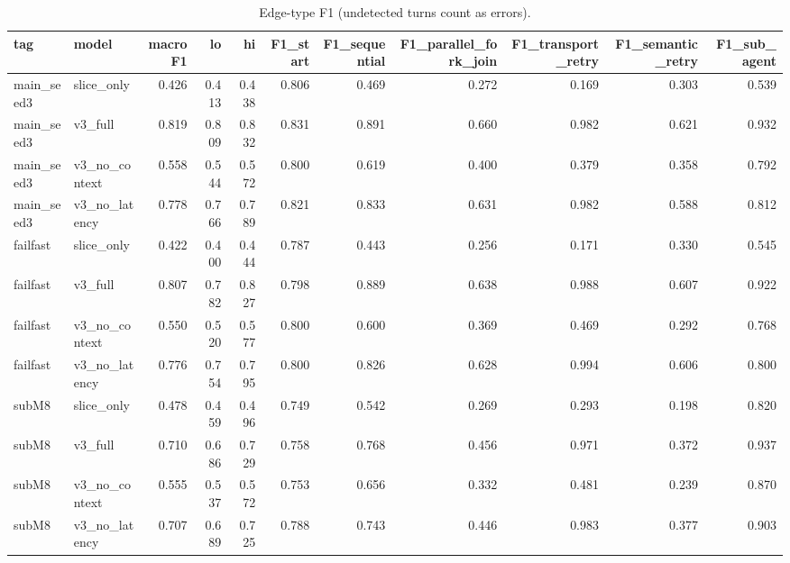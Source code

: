 \begin{table}
\caption{Edge-type F1 (undetected turns count as errors).}
\label{tab:edges}
\begin{tabular}{llrrrrrrrrr}
\toprule
tag & model & macroF1 & lo & hi & F1\_start & F1\_sequential & F1\_parallel\_fork\_join & F1\_transport\_retry & F1\_semantic\_retry & F1\_sub\_agent \\
\midrule
main\_seed3 & slice\_only & 0.426 & 0.413 & 0.438 & 0.806 & 0.469 & 0.272 & 0.169 & 0.303 & 0.539 \\
main\_seed3 & v3\_full & 0.819 & 0.809 & 0.832 & 0.831 & 0.891 & 0.660 & 0.982 & 0.621 & 0.932 \\
main\_seed3 & v3\_no\_context & 0.558 & 0.544 & 0.572 & 0.800 & 0.619 & 0.400 & 0.379 & 0.358 & 0.792 \\
main\_seed3 & v3\_no\_latency & 0.778 & 0.766 & 0.789 & 0.821 & 0.833 & 0.631 & 0.982 & 0.588 & 0.812 \\
failfast & slice\_only & 0.422 & 0.400 & 0.444 & 0.787 & 0.443 & 0.256 & 0.171 & 0.330 & 0.545 \\
failfast & v3\_full & 0.807 & 0.782 & 0.827 & 0.798 & 0.889 & 0.638 & 0.988 & 0.607 & 0.922 \\
failfast & v3\_no\_context & 0.550 & 0.520 & 0.577 & 0.800 & 0.600 & 0.369 & 0.469 & 0.292 & 0.768 \\
failfast & v3\_no\_latency & 0.776 & 0.754 & 0.795 & 0.800 & 0.826 & 0.628 & 0.994 & 0.606 & 0.800 \\
subM8 & slice\_only & 0.478 & 0.459 & 0.496 & 0.749 & 0.542 & 0.269 & 0.293 & 0.198 & 0.820 \\
subM8 & v3\_full & 0.710 & 0.686 & 0.729 & 0.758 & 0.768 & 0.456 & 0.971 & 0.372 & 0.937 \\
subM8 & v3\_no\_context & 0.555 & 0.537 & 0.572 & 0.753 & 0.656 & 0.332 & 0.481 & 0.239 & 0.870 \\
subM8 & v3\_no\_latency & 0.707 & 0.689 & 0.725 & 0.788 & 0.743 & 0.446 & 0.983 & 0.377 & 0.903 \\
\bottomrule
\end{tabular}
\end{table}
